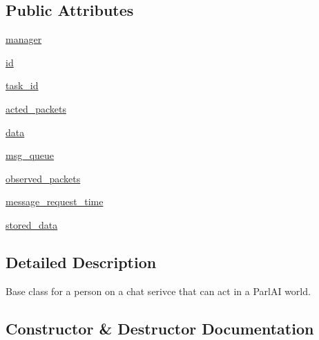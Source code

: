 \subsection*{Public Attributes}
\begin{DoxyCompactItemize}
\item 
\hyperlink{classparlai_1_1chat__service_1_1core_1_1agents_1_1ChatServiceAgent_a8216a688db46e2aa7cdd023016ecf27c}{manager}
\item 
\hyperlink{classparlai_1_1chat__service_1_1core_1_1agents_1_1ChatServiceAgent_abb09786f0faf1d21a0521dd105f35c40}{id}
\item 
\hyperlink{classparlai_1_1chat__service_1_1core_1_1agents_1_1ChatServiceAgent_a1f1f978765ae81ca5ec8d04d14575386}{task\+\_\+id}
\item 
\hyperlink{classparlai_1_1chat__service_1_1core_1_1agents_1_1ChatServiceAgent_ac394b3601eb7039d5fb43c38795bbf49}{acted\+\_\+packets}
\item 
\hyperlink{classparlai_1_1chat__service_1_1core_1_1agents_1_1ChatServiceAgent_a6e02c9025ec3cf0ba64c58896ff97cc6}{data}
\item 
\hyperlink{classparlai_1_1chat__service_1_1core_1_1agents_1_1ChatServiceAgent_ae7b1e47cce1528d7f6836a0a6875e43a}{msg\+\_\+queue}
\item 
\hyperlink{classparlai_1_1chat__service_1_1core_1_1agents_1_1ChatServiceAgent_acb729e7d0bce867d891d15c08a3704fc}{observed\+\_\+packets}
\item 
\hyperlink{classparlai_1_1chat__service_1_1core_1_1agents_1_1ChatServiceAgent_a559242012ccef00ab3b2f9393cf67da6}{message\+\_\+request\+\_\+time}
\item 
\hyperlink{classparlai_1_1chat__service_1_1core_1_1agents_1_1ChatServiceAgent_a62cf09938c47f55c204637e56d089167}{stored\+\_\+data}
\end{DoxyCompactItemize}


\subsection{Detailed Description}
\begin{DoxyVerb}Base class for a person on a chat serivce that can act in a ParlAI world.
\end{DoxyVerb}
 

\subsection{Constructor \& Destructor Documentation}
\mbox{\label{classparlai_1_1chat__service_1_1core_1_1agents_1_1ChatServiceAgent_a75af2a1c4766564b0143595ed8a5e3c9}} 
